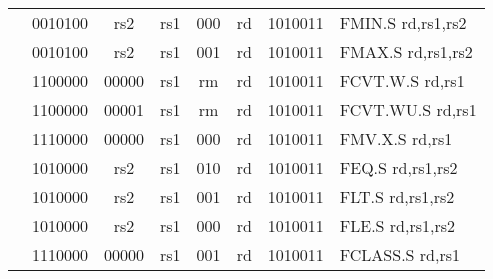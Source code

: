 \begin{table}[p]
\begin{small}
\begin{center}
\begin{tabular}{p{0in}p{0.4in}p{0.05in}p{0.05in}p{0.05in}p{0.05in}p{0.4in}p{0.6in}p{0.4in}p{0.6in}p{0.7in}l}
&
\multicolumn{4}{|c|}{0010100} &
\multicolumn{2}{c|}{rs2} &
\multicolumn{1}{c|}{rs1} &
\multicolumn{1}{c|}{000} &
\multicolumn{1}{c|}{rd} &
\multicolumn{1}{c|}{1010011} & FMIN.S rd,rs1,rs2 \\
\cline{2-11}
  

&
\multicolumn{4}{|c|}{0010100} &
\multicolumn{2}{c|}{rs2} &
\multicolumn{1}{c|}{rs1} &
\multicolumn{1}{c|}{001} &
\multicolumn{1}{c|}{rd} &
\multicolumn{1}{c|}{1010011} & FMAX.S rd,rs1,rs2 \\
\cline{2-11}
  

&
\multicolumn{4}{|c|}{1100000} &
\multicolumn{2}{c|}{00000} &
\multicolumn{1}{c|}{rs1} &
\multicolumn{1}{c|}{rm} &
\multicolumn{1}{c|}{rd} &
\multicolumn{1}{c|}{1010011} & FCVT.W.S rd,rs1 \\
\cline{2-11}
  

&
\multicolumn{4}{|c|}{1100000} &
\multicolumn{2}{c|}{00001} &
\multicolumn{1}{c|}{rs1} &
\multicolumn{1}{c|}{rm} &
\multicolumn{1}{c|}{rd} &
\multicolumn{1}{c|}{1010011} & FCVT.WU.S rd,rs1 \\
\cline{2-11}
  

&
\multicolumn{4}{|c|}{1110000} &
\multicolumn{2}{c|}{00000} &
\multicolumn{1}{c|}{rs1} &
\multicolumn{1}{c|}{000} &
\multicolumn{1}{c|}{rd} &
\multicolumn{1}{c|}{1010011} & FMV.X.S rd,rs1 \\
\cline{2-11}
  

&
\multicolumn{4}{|c|}{1010000} &
\multicolumn{2}{c|}{rs2} &
\multicolumn{1}{c|}{rs1} &
\multicolumn{1}{c|}{010} &
\multicolumn{1}{c|}{rd} &
\multicolumn{1}{c|}{1010011} & FEQ.S rd,rs1,rs2 \\
\cline{2-11}
  

&
\multicolumn{4}{|c|}{1010000} &
\multicolumn{2}{c|}{rs2} &
\multicolumn{1}{c|}{rs1} &
\multicolumn{1}{c|}{001} &
\multicolumn{1}{c|}{rd} &
\multicolumn{1}{c|}{1010011} & FLT.S rd,rs1,rs2 \\
\cline{2-11}
  

&
\multicolumn{4}{|c|}{1010000} &
\multicolumn{2}{c|}{rs2} &
\multicolumn{1}{c|}{rs1} &
\multicolumn{1}{c|}{000} &
\multicolumn{1}{c|}{rd} &
\multicolumn{1}{c|}{1010011} & FLE.S rd,rs1,rs2 \\
\cline{2-11}
  

&
\multicolumn{4}{|c|}{1110000} &
\multicolumn{2}{c|}{00000} &
\multicolumn{1}{c|}{rs1} &
\multicolumn{1}{c|}{001} &
\multicolumn{1}{c|}{rd} &
\multicolumn{1}{c|}{1010011} & FCLASS.S rd,rs1 \\
\cline{2-11}
  


\end{tabular}
\end{center}
\end{small}
\end{table}
